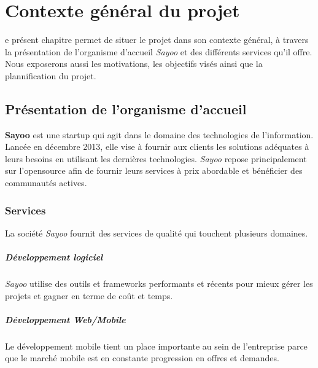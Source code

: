 \chapter{Contexte général du projet}
\begin{onehalfspace}

e présent chapitre permet de situer le projet dans son contexte général, à travers la présentation de l'organisme d'accueil \emph{Sayoo} et des différents services qu'il offre. Nous exposerons aussi les motivations, les objectifs visés ainsi que la plannification du projet.

\newpage


\section{Présentation de l'organisme d'accueil}

\textbf{Sayoo} est une startup qui agit dans le domaine des technologies de l'information. Lancée en décembre 2013, elle vise à fournir aux clients les solutions adéquates à leurs besoins en utilisant les dernières technologies. \emph{Sayoo} repose principalement sur l'opensource afin de fournir leurs services à prix abordable et bénéficier des communautés actives. 



\subsection{Services}
La société \emph{Sayoo} fournit des services de qualité qui touchent plusieurs domaines.
\paragraph*{Développement logiciel}
\emph{Sayoo} utilise des outils et frameworks performants et récents pour mieux gérer les projets et gagner en terme de coût et temps.

\paragraph*{Développement Web/Mobile}
Le développement mobile tient un place importante au sein de l'entreprise parce que le marché mobile est en constante progression en offres et demandes. 


\end{onehalfspace}

